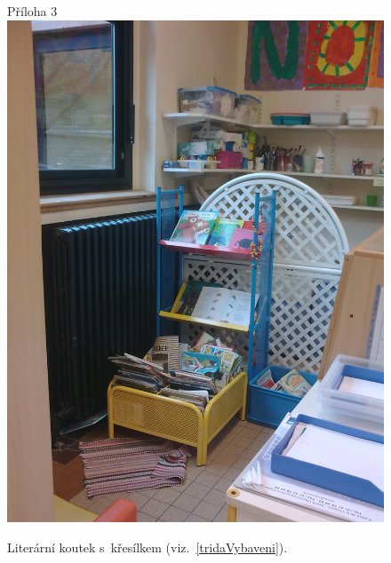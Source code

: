 	\begin{figure}[tb]
		\centering
		Příloha 3\\
		\includegraphics[height = 0.35\textheight]{./fotky/Obr3.jpg}
		\caption{
			Literární koutek s~křesílkem (viz.~\ref{tridaVybaveni}).
		}
		\label{Obr3}
	\end{figure}

